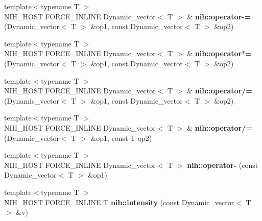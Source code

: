 \begin{DoxyCompactItemize}
\item 
\hypertarget{group__vectors_ga82cdc8251f47077b9f8c1039ef58cf49}{
{\footnotesize template$<$typename T $>$ }\\\-N\-I\-H\-\_\-\-H\-O\-S\-T \-F\-O\-R\-C\-E\-\_\-\-I\-N\-L\-I\-N\-E \*
\-Dynamic\-\_\-vector$<$ \-T $>$ \& {\bfseries nih\-::operator-\/=} (\-Dynamic\-\_\-vector$<$ \-T $>$ \&op1, const \-Dynamic\-\_\-vector$<$ \-T $>$ \&op2)}
\label{group__vectors_ga82cdc8251f47077b9f8c1039ef58cf49}

\item 
\hypertarget{group__vectors_gaed066074df6e2c212e0391c9ad7f3ab4}{
{\footnotesize template$<$typename T $>$ }\\\-N\-I\-H\-\_\-\-H\-O\-S\-T \-F\-O\-R\-C\-E\-\_\-\-I\-N\-L\-I\-N\-E \*
\-Dynamic\-\_\-vector$<$ \-T $>$ \& {\bfseries nih\-::operator$\ast$=} (\-Dynamic\-\_\-vector$<$ \-T $>$ \&op1, const \-Dynamic\-\_\-vector$<$ \-T $>$ \&op2)}
\label{group__vectors_gaed066074df6e2c212e0391c9ad7f3ab4}

\item 
\hypertarget{group__vectors_ga39a60ac993fe55bd154195143103db47}{
{\footnotesize template$<$typename T $>$ }\\\-N\-I\-H\-\_\-\-H\-O\-S\-T \-F\-O\-R\-C\-E\-\_\-\-I\-N\-L\-I\-N\-E \*
\-Dynamic\-\_\-vector$<$ \-T $>$ \& {\bfseries nih\-::operator/=} (\-Dynamic\-\_\-vector$<$ \-T $>$ \&op1, const \-Dynamic\-\_\-vector$<$ \-T $>$ \&op2)}
\label{group__vectors_ga39a60ac993fe55bd154195143103db47}

\item 
\hypertarget{group__vectors_gaea3d6db75903c3527b138f4f0fefca65}{
{\footnotesize template$<$typename T $>$ }\\\-N\-I\-H\-\_\-\-H\-O\-S\-T \-F\-O\-R\-C\-E\-\_\-\-I\-N\-L\-I\-N\-E \*
\-Dynamic\-\_\-vector$<$ \-T $>$ \& {\bfseries nih\-::operator/=} (\-Dynamic\-\_\-vector$<$ \-T $>$ \&op1, const \-T op2)}
\label{group__vectors_gaea3d6db75903c3527b138f4f0fefca65}

\item 
\hypertarget{group__vectors_ga95b070c73b1d688ad69d771bd8805c2a}{
{\footnotesize template$<$typename T $>$ }\\\-N\-I\-H\-\_\-\-H\-O\-S\-T \-F\-O\-R\-C\-E\-\_\-\-I\-N\-L\-I\-N\-E \*
\-Dynamic\-\_\-vector$<$ \-T $>$ {\bfseries nih\-::operator-\/} (const \-Dynamic\-\_\-vector$<$ \-T $>$ \&op1)}
\label{group__vectors_ga95b070c73b1d688ad69d771bd8805c2a}

\item 
\hypertarget{group__vectors_ga1e83c791b1d46a853b46036c61531ebe}{
{\footnotesize template$<$typename T $>$ }\\\-N\-I\-H\-\_\-\-H\-O\-S\-T \-F\-O\-R\-C\-E\-\_\-\-I\-N\-L\-I\-N\-E \-T {\bfseries nih\-::intensity} (const \-Dynamic\-\_\-vector$<$ \-T $>$ \&v)}
\label{group__vectors_ga1e83c791b1d46a853b46036c61531ebe}


\end{DoxyCompactItemize}
